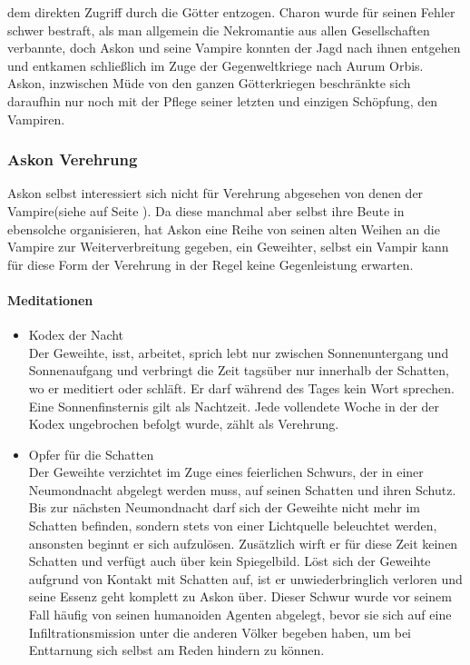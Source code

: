\documentclass[a4paper,12pt,oneside]{book}
\begin{document}
dem direkten Zugriff durch die Götter entzogen. Charon wurde für seinen Fehler schwer bestraft, als man allgemein die Nekromantie aus allen Gesellschaften verbannte, doch Askon und seine Vampire konnten der Jagd nach ihnen entgehen und entkamen schließlich im Zuge der Gegenweltkriege nach Aurum Orbis. Askon, inzwischen Müde von den ganzen Götterkriegen beschränkte sich daraufhin nur noch mit der Pflege seiner letzten und einzigen Schöpfung, den Vampiren. 
\subsubsection{Askon Verehrung}
Askon selbst interessiert sich nicht für Verehrung abgesehen von denen der Vampire(siehe auf Seite \pageref{Vampire:AskonGaben}). Da diese manchmal aber selbst ihre Beute in ebensolche organisieren, hat Askon eine Reihe von seinen alten Weihen an die Vampire zur Weiterverbreitung gegeben, ein Geweihter, selbst ein Vampir kann für diese Form der Verehrung in der Regel keine Gegenleistung erwarten.
\paragraph{Meditationen}
\begin{itemize}
\item Kodex der Nacht
\\Der Geweihte, isst, arbeitet, sprich lebt nur zwischen Sonnenuntergang und Sonnenaufgang und verbringt die Zeit tagsüber nur innerhalb der Schatten, wo er meditiert oder schläft. Er darf während des Tages kein Wort sprechen. Eine Sonnenfinsternis gilt als Nachtzeit. Jede vollendete Woche in der der Kodex ungebrochen befolgt wurde, zählt als Verehrung.
\item Opfer für die Schatten
\\Der Geweihte verzichtet im Zuge eines feierlichen Schwurs, der in einer Neumondnacht abgelegt werden muss, auf seinen Schatten und ihren Schutz. Bis zur nächsten Neumondnacht darf sich der Geweihte nicht mehr im Schatten befinden, sondern stets von einer Lichtquelle beleuchtet werden, ansonsten beginnt er sich aufzulösen. Zusätzlich wirft er für diese Zeit keinen Schatten und verfügt auch über kein Spiegelbild. Löst sich der Geweihte aufgrund von Kontakt mit Schatten auf, ist er unwiederbringlich verloren und seine Essenz geht komplett zu Askon über. Dieser Schwur wurde vor seinem Fall häufig von seinen humanoiden Agenten abgelegt, bevor sie sich auf eine Infiltrationsmission unter die anderen Völker begeben haben, um bei Enttarnung sich selbst am Reden hindern zu können.
\end{itemize}
\end{document}

